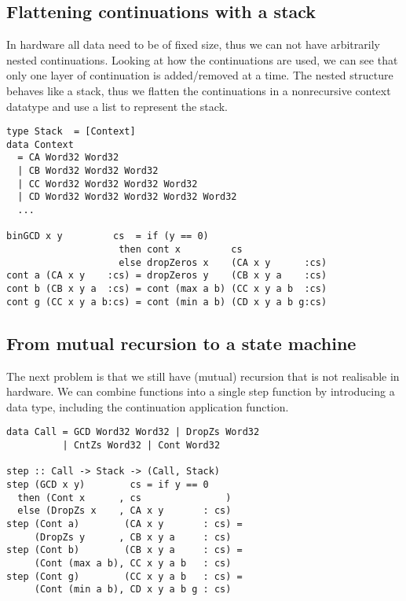 \documentclass[preprint]{sigplanconf}
\def\codefamily{\sffamily\normalsize}
\def\codesmall{\sffamily\small}
\begin{document}
\subsection{Flattening continuations with a stack}
In hardware all data need to be of fixed size, thus we can not have arbitrarily nested continuations.
Looking at how the continuations are used, we can see that only one layer of continuation is added/removed at a time.
The nested structure behaves like a stack, thus we flatten the continuations in a nonrecursive context datatype and use a list to represent the stack.

\lstset{basicstyle=\codesmall}
\begin{lstlisting}
type Stack  = [Context]
data Context
  = CA Word32 Word32
  | CB Word32 Word32 Word32
  | CC Word32 Word32 Word32 Word32
  | CD Word32 Word32 Word32 Word32 Word32
  ...

binGCD x y         cs  = if (y == 0)
                    then cont x         cs
                    else dropZeros x    (CA x y      :cs)
cont a (CA x y    :cs) = dropZeros y    (CB x y a    :cs)
cont b (CB x y a  :cs) = cont (max a b) (CC x y a b  :cs)
cont g (CC x y a b:cs) = cont (min a b) (CD x y a b g:cs)
\end{lstlisting}
\lstset{basicstyle=\codefamily}

\subsection{From mutual recursion to a state machine}
The next problem is that we still have (mutual) recursion that is not realisable in hardware.
We can combine functions into a single step function by introducing a data type, including the continuation application function. \\


\begin{lstlisting}
data Call = GCD Word32 Word32 | DropZs Word32
          | CntZs Word32 | Cont Word32

step :: Call -> Stack -> (Call, Stack)
step (GCD x y)        cs = if y == 0
  then (Cont x      , cs               )
  else (DropZs x    , CA x y       : cs)
step (Cont a)        (CA x y       : cs) =
     (DropZs y      , CB x y a     : cs)
step (Cont b)        (CB x y a     : cs) =
     (Cont (max a b), CC x y a b   : cs)
step (Cont g)        (CC x y a b   : cs) =
     (Cont (min a b), CD x y a b g : cs)
\end{lstlisting}
\end{document}
